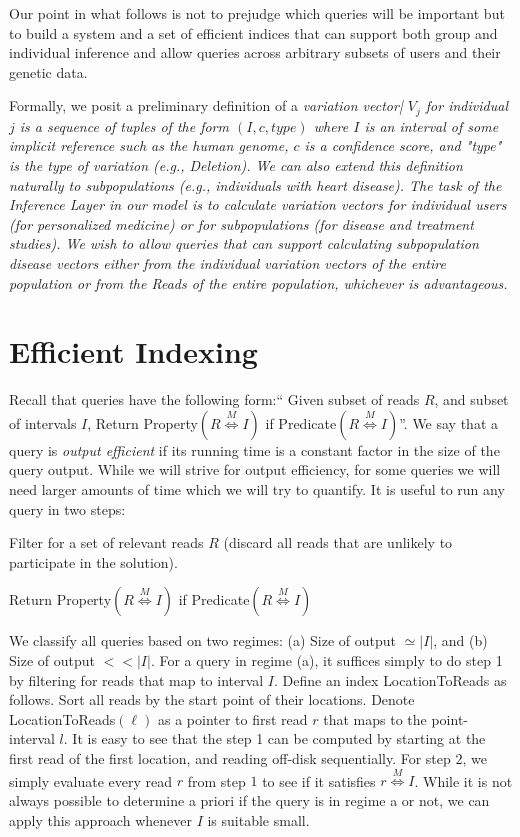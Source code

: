 \documentclass[10pt,fullpage]{article}
\newcommand{\MapRel}{\ensuremath{\stackrel{M}{\Leftrightarrow}}}
\newenvironment{packed_enum}{
\begin{enumerate}
  \setlength{\itemsep}{1pt}
  \setlength{\parskip}{0pt}
  \setlength{\parsep}{0pt}
}{\end{enumerate}}
\begin{document}
Our point in what follows is not to prejudge which queries 
will be important but to build a system and a set of efficient
indices that can support both group and individual inference
and allow queries across arbitrary subsets of users and
their genetic data.

Formally, we posit a preliminary definition of a
{\em variation vector| $V_j$ for individual
$j$ is a sequence of tuples of the form $(I, c, type)$ 
where $I$ is an interval of some implicit reference such
as the human genome, $c$ is a confidence score, and 
"type" is the  type of variation (e.g., Deletion).  We 
can also extend this definition naturally to subpopulations 
(e.g., individuals with heart disease).  The task of the
Inference Layer in our model is to calculate variation vectors
for individual users (for personalized medicine) or for
subpopulations (for disease and treatment studies).   
We wish to allow queries that can support calculating 
subpopulation disease vectors either from the individual 
variation vectors of the entire population or from the
Reads of the entire population, whichever is advantageous.}

\section{Efficient Indexing}
Recall that queries have the following form:`` Given subset of reads
$R$, and subset of intervals $I$, Return {\sc Property}$(R\MapRel I)$
if {\sc Predicate}$(R\MapRel I)$''.  We say that a query is {\em
  output efficient} if its running time is a constant factor in the
size of the query output.  While we will strive for output efficiency,
for some queries we will need larger amounts of time which we will try
to quantify. It is useful to run any query in two steps:
\begin{packed_enum}
\item Filter for a set of relevant reads $R$ (discard all reads that are unlikely to participate in the solution).
\item Return {\sc Property}$(R\MapRel I)$ if {\sc Predicate}$(R\MapRel I)$
\end{packed_enum}
We classify all queries based on two regimes: (a) Size of output
$\simeq |I|$, and (b) Size of output $<< |I|$. For a query in regime
(a), it suffices simply to do step 1 by filtering for reads that map
to interval $I$.  Define an index {\sc LocationToReads} as
follows. Sort all reads by the start point of their locations. Denote
{\sc LocationToReads}$(\ell)$ as a pointer to first read $r$ that maps
to the point-interval $l$. It is easy to see that the step 1 can be
computed by starting at the first read of the first location, and
reading off-disk sequentially. For step $2$, we simply evaluate every
read $r$ from step $1$ to see if it satisfies $r\MapRel I$. While it
is not always possible to determine a priori if the query is in regime
a or not, we can apply this approach whenever $I$ is suitable small.
\end{document}
